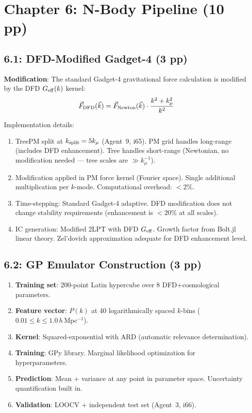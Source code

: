 \documentclass[11pt,a4paper]{article}
\begin{document}
\section{Chapter 6: N-Body Pipeline (10 pp)}

\subsection{6.1: DFD-Modified Gadget-4 (3 pp)}

\textbf{Modification}: The standard Gadget-4 gravitational force calculation is modified by the DFD $G_{\rm eff}(k)$ kernel:
\begin{equation}
\vec{F}_{\rm DFD}(\vec{k}) = \vec{F}_{\rm Newton}(\vec{k}) \cdot \frac{k^2 + k_\mu^2}{k^2}
\end{equation}

Implementation details:
\begin{enumerate}
\item TreePM split at $k_{\rm split} = 5k_\mu$ (Agent~9, i65). PM grid handles long-range (includes DFD enhancement). Tree handles short-range (Newtonian, no modification needed --- tree scales are $\gg k_\mu^{-1}$).

\item Modification applied in PM force kernel (Fourier space). Single additional multiplication per $k$-mode. Computational overhead: $< 2\%$.

\item Time-stepping: Standard Gadget-4 adaptive. DFD modification does not change stability requirements (enhancement is $< 20\%$ at all scales).

\item IC generation: Modified 2LPT with DFD $G_{\rm eff}$. Growth factor from Bolt.jl linear theory. Zel'dovich approximation adequate for DFD enhancement level.
\end{enumerate}

\subsection{6.2: GP Emulator Construction (3 pp)}

\begin{enumerate}
\item \textbf{Training set}: 200-point Latin hypercube over 8 DFD+cosmological parameters.
\item \textbf{Feature vector}: $P(k)$ at 40 logarithmically spaced $k$-bins ($0.01 \leq k \leq 1.0\,h\,$Mpc$^{-1}$).
\item \textbf{Kernel}: Squared-exponential with ARD (automatic relevance determination).
\item \textbf{Training}: GPy library. Marginal likelihood optimization for hyperparameters.
\item \textbf{Prediction}: Mean + variance at any point in parameter space. Uncertainty quantification built in.
\item \textbf{Validation}: LOOCV + independent test set (Agent~3, i66).
\end{enumerate}
\end{document}
